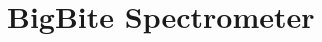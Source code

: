 \part{BigBite Spectrometer}
\graphicspath{{bigbite/figs/}}
\renewcommand{\dirfig}[0]{bigbite/figs}
\renewcommand{\dircur}[0]{bigbite}


%


%
%

